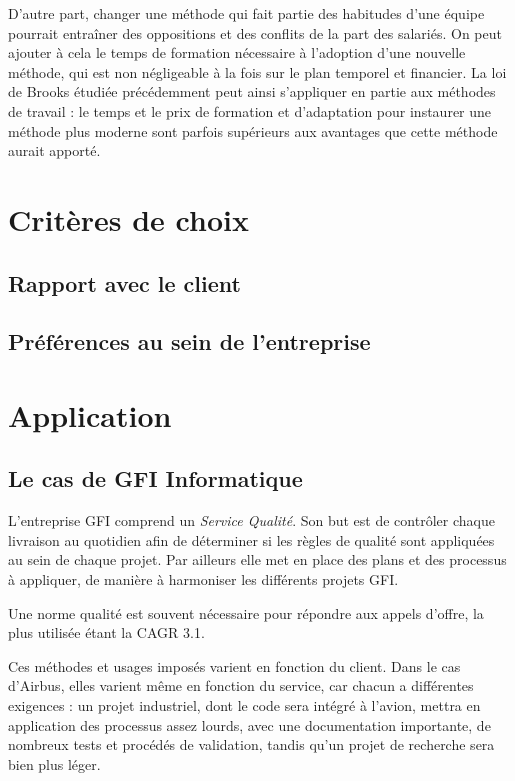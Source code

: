 D'autre part, changer une méthode qui fait partie des habitudes d'une équipe pourrait entraîner des oppositions et des conflits de la part des salariés. On peut ajouter à cela le temps de formation nécessaire à l'adoption d'une nouvelle méthode, qui est non négligeable à la fois sur le plan temporel et financier. La loi de Brooks étudiée précédemment peut ainsi s'appliquer en partie aux méthodes de travail : le temps et le prix de formation et d'adaptation pour instaurer une méthode plus moderne sont parfois supérieurs aux avantages que cette méthode aurait apporté.

\section{Critères de choix}

\subsection{Rapport avec le client}

\subsection{Préférences au sein de l'entreprise}

\section{Application}

\subsection{Le cas de GFI Informatique}

L'entreprise GFI comprend un \textit{Service Qualité}. Son but est de contrôler chaque livraison au quotidien afin de déterminer si les règles de qualité sont appliquées au sein de chaque projet. Par ailleurs elle met en place des plans et des processus à appliquer, de manière à harmoniser les différents projets GFI.

Une norme qualité est souvent nécessaire pour répondre aux appels d'offre, la plus utilisée étant la CAGR 3.1.

Ces méthodes et usages imposés varient en fonction du client. Dans le cas d'Airbus, elles varient même en fonction du service, car chacun a différentes exigences : un projet industriel, dont le code sera intégré à l'avion, mettra en application des processus assez lourds, avec une documentation importante, de nombreux tests et procédés de validation, tandis qu'un projet de recherche sera bien plus léger.

